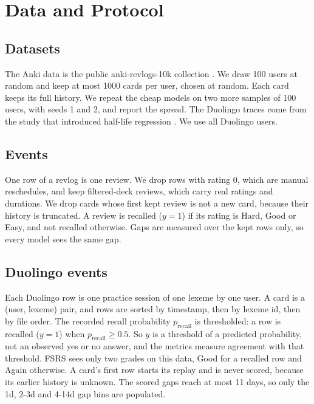\section{Data and Protocol}
\subsection{Datasets}
The Anki data is the public anki-revlogs-10k collection \cite{ankirevlogs10k}.
We draw 100 users at random and keep at most 1000 cards per user, chosen at random.
Each card keeps its full history.
We repeat the cheap models on two more samples of 100 users, with seeds 1 and 2, and report the spread.
The Duolingo traces come from the study that introduced half-life regression \cite{settles2016trainable}.
We use all Duolingo users.

\subsection{Events}
One row of a revlog is one review.
We drop rows with rating 0, which are manual reschedules, and keep filtered-deck reviews, which carry real ratings and durations.
We drop cards whose first kept review is not a new card, because their history is truncated.
A review is recalled ($y=1$) if its rating is Hard, Good or Easy, and not recalled otherwise.
Gaps are measured over the kept rows only, so every model sees the same gap.

\subsection{Duolingo events}
Each Duolingo row is one practice session of one lexeme by one user.
A card is a (user, lexeme) pair, and rows are sorted by timestamp, then by lexeme id, then by file order.
The recorded recall probability $p_{\mathrm{recall}}$ is thresholded: a row is recalled ($y=1$) when $p_{\mathrm{recall}} \ge 0.5$.
So $y$ is a threshold of a predicted probability, not an observed yes or no answer, and the metrics measure agreement with that threshold.
FSRS sees only two grades on this data, Good for a recalled row and Again otherwise.
A card's first row starts its replay and is never scored, because its earlier history is unknown.
The scored gaps reach at most 11 days, so only the 1d, 2-3d and 4-14d gap bins are populated.

